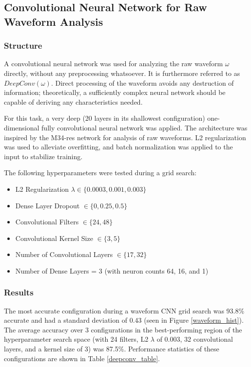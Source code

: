 \documentclass[10pt]{article}
\begin{document}
\subsection{Convolutional Neural Network for Raw Waveform Analysis}

\subsubsection{Structure}

A convolutional neural network was used for analyzing the raw waveform $\omega$ directly, without any preprocessing whatsoever. It is furthermore referred to as $DeepConv(\omega)$. Direct processing of the waveform avoids any destruction of information; theoretically, a sufficiently complex neural network should be capable of deriving any characteristics needed.

For this task, a very deep (20 layers in its shallowest configuration) one-dimensional fully convolutional neural network was applied. The architecture was inspired by the M34-res network \cite{verydeepconvnets} for analysis of raw waveforms. L2 regularization was used to alleviate overfitting, and batch normalization was applied to the input to stabilize training.

The following hyperparameters were tested during a grid search:
\begin{itemize}
    \item L2 Regularization $\lambda \in \{0.0003, 0.001, 0.003\}$
    \item Dense Layer Dropout $\in \{0, 0.25, 0.5\}$
    \item Convolutional Filters $\in \{24, 48\}$
    \item Convolutional Kernel Size $\in \{3, 5\}$
    \item Number of Convolutional Layers $\in \{17, 32\}$
    \item Number of Dense Layers = 3 (with neuron counts 64, 16, and 1)
\end{itemize}

\subsubsection{Results}

The most accurate configuration during a waveform CNN grid search was 93.8\% accurate and had a standard deviation of 0.43 (seen in Figure \ref{waveform_hist}). The average accuracy over 3 configurations in the best-performing region of the hyperparameter search space (with 24 filters, L2 $\lambda$ of 0.003, 32 convolutional layers, and a kernel size of 3) was 87.5\%. Performance statistics of these configurations are shown in Table \ref{deepconv_table}.
\end{document}
